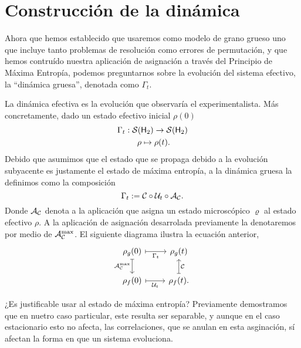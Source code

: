 \section{Construcción de la dinámica}\label{sec:ch2dycon}

Ahora que hemos establecido que usaremos como modelo de grano grueso uno que incluye tanto problemas de resolución como errores de permutación, y que hemos contruído nuestra aplicación de asignación a través del Principio de Máxima Entropía, podemos preguntarnos sobre la evolución del sistema efectivo, la ``dinámica gruesa'', denotada como $\Gamma_t$.

La dinámica efectiva es la evolución que observaría el experimentalista. Más concretamente, dado un estado efectivo inicial $\rho(0)$
\begin{gather*}
\Gamma_{t}:\mcS(\hilbert_2)\rightarrow \mcS(\hilbert_2)\\
\rho \mapsto \rho(t)\rlap{.}
\end{gather*}
Debido que asumimos que el estado que se propaga debido a la evolución subyacente es justamente el estado de máxima entropía, a la dinámica gruesa la definimos como la composición
\begin{equation*}
\Gamma_t:=\mathcal{C} \circ \mathcal{U}_t \circ \mathcal{A}_{\mathcal{C}}.
\end{equation*}
Donde $\mathcal{A}_{\mathcal{C}}$ denota a la aplicación que asigna un estado microscópico $\varrho$ al estado efectivo $\rho$. A la aplicación de asignación desarrolada previamente la denotaremos por medio de $\mathcal{A}_{\mathcal{C}}^{\max}$. El siguiente diagrama ilustra la ecuación anterior,
\[\begin{tikzcd}[arrows={<-|}]
\rho_{g}(0)  & \rho_{g}(t) \arrow{l}{\Gamma_{t}} \arrow{d}{\mcC}\\
\rho_{f}(0) \arrow{u}{\mcA_{\mcC}^{\max}} & \rho_{f}(t). \arrow{l}{\mcU_{t}}
\end{tikzcd}
\]

¿Es justificable usar al estado de máxima entropía? Previamente demostramos que en nuetro caso particular, este resulta ser separable, y aunque en el caso estacionario esto no afecta, las correlaciones, que se anulan en esta asginación, sí afectan la forma en que un sistema evoluciona.

